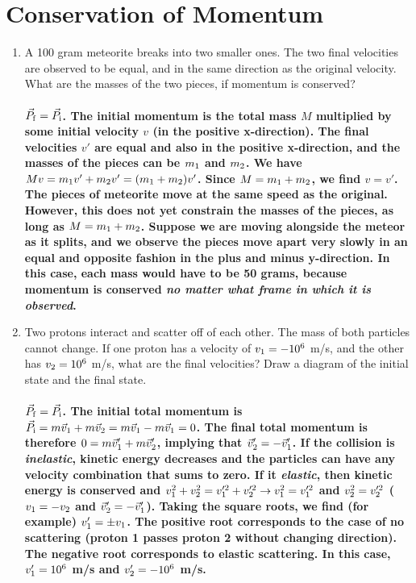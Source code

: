 \documentclass[10pt]{article}
\begin{document}
\section{Conservation of Momentum}
\begin{enumerate}
\item A 100 gram meteorite breaks into two smaller ones.  The two final velocities are observed to be equal, and in the same direction as the original velocity.  What are the masses of the two pieces, if momentum is conserved? \\ \\
\textbf{$\vec{P}_{\rm f} = \vec{P}_{\rm i}$.  The initial momentum is the total mass $M$ multiplied by some initial velocity $v$ (in the positive x-direction).  The final velocities $v'$ are equal and also in the positive x-direction, and the masses of the pieces can be $m_{\rm 1}$ and $m_{\rm 2}$.  We have $Mv = m_{\rm 1} v' + m_{\rm 2} v' = (m_{\rm 1} + m_{\rm 2}) v'$.  Since $M = m_{\rm 1} + m_{\rm 2}$, we find $v = v'$.  The pieces of meteorite move at the same speed as the original.  However, this does not yet constrain the masses of the pieces, as long as $M = m_{\rm 1} + m_{\rm 2}$.  Suppose we are moving alongside the meteor as it splits, and we observe the pieces move apart very slowly in an equal and opposite fashion in the plus and minus y-direction.  In this case, each mass would have to be 50 grams, because momentum is conserved \textit{no matter what frame in which it is observed}.}
\item Two protons interact and scatter off of each other.  The mass of both particles cannot change.  If one proton has a velocity of $v_{\rm 1} = -10^{6}$ m/s, and the other has $v_{\rm 2} = 10^{6}$ m/s, what are the final velocities?  Draw a diagram of the initial state and the final state.  \\ \\
\textbf{$\vec{P}_{\rm f} = \vec{P}_{\rm i}$.  The initial total momentum is $\vec{P}_{\rm i} = m\vec{v}_{\rm 1} + m\vec{v}_{\rm 2} = m\vec{v}_{\rm 1} - m\vec{v}_{\rm 1} = 0$.  The final total momentum is therefore $0 = m\vec{v}_{\rm 1}' + m\vec{v}_{\rm 2}'$, implying that $\vec{v}_{\rm 2}' = -\vec{v}_{\rm 1}'$.  If the collision is \textit{inelastic}, kinetic energy decreases and the particles can have any velocity combination that sums to zero.  If it \textit{elastic}, then kinetic energy is conserved and $v_{\rm 1}^2 + v_{\rm 2}^2 = v_{\rm 1}'^2 + v_{\rm 2}'^2 \rightarrow v_{\rm 1}^2 = v_{\rm 1}'^2$ and $v_{\rm 2}^2 = v_{\rm 2}'^2$ ($v_{\rm 1} = -v_{\rm 2}$ and $\vec{v}_{\rm 2}' = -\vec{v}_{\rm 1}'$).  Taking the square roots, we find (for example) $v_{\rm 1}' = \pm v_{\rm 1}$.  The positive root corresponds to the case of no scattering (proton 1 passes proton 2 without changing direction).  The negative root corresponds to elastic scattering.  In this case, $v_{\rm 1}' = 10^6$ m/s and $v_{\rm 2}' = -10^6$ m/s.}
\end{enumerate}
\end{document}
